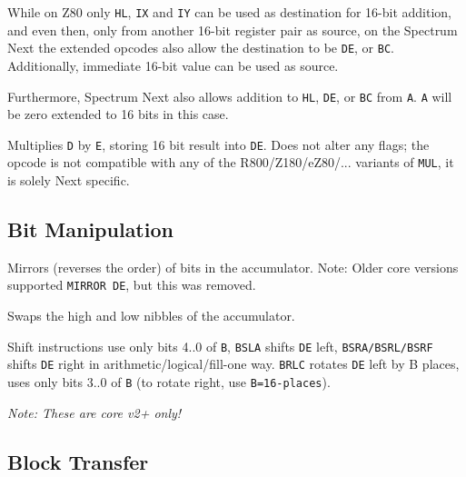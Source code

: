 \documentclass[oneside,a4paper]{book}
\begin{document}
\begin{description}


	While on Z80 only {\tt HL}, {\tt IX} and {\tt IY} can be used as destination for 16-bit addition, and even then, only from another 16-bit register pair as source, on the Spectrum Next the extended opcodes also allow the destination to be {\tt DE}, or {\tt BC}. Additionally, immediate 16-bit value can be used as source.

	Furthermore, Spectrum Next also allows addition to {\tt HL}, {\tt DE}, or {\tt BC} from {\tt A}. {\tt A} will be zero extended to 16 bits in this case.


	Multiplies {\tt D} by {\tt E}, storing 16 bit result into {\tt DE}. Does not alter any flags;
	the opcode is not compatible with any of the R800/Z180/eZ80/... variants of {\tt MUL}, it is solely Next specific.

\end{description}

\pagebreak
\subsection{Bit Manipulation}

\begin{description}
	
	
	Mirrors (reverses the order) of bits in the accumulator. Note: Older core versions supported {\tt MIRROR DE}, but this was removed.


	Swaps the high and low nibbles of the accumulator.

	
	Shift instructions use only bits 4..0 of {\tt B}, {\tt BSLA} shifts {\tt DE} left, {\tt BSRA/BSRL/BSRF} shifts {\tt DE} right in arithmetic/logical/fill-one way. {\tt BRLC} rotates {\tt DE} left by B places, uses only bits 3..0 of {\tt B} (to rotate right, use {\tt B=16-places}).

	\emph{Note: These are core v2+ only!}

\end{description}
	
\subsection{Block Transfer}
\end{document}
